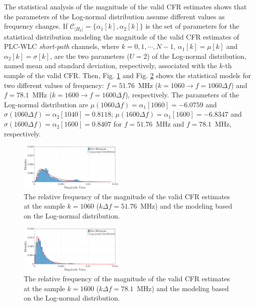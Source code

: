 \documentclass[journal]{IEEEtran}
\begin{document}
The statistical analysis of the magnitude of the valid \ac{CFR} estimates shows that the parameters of the Log-normal distribution assume different values as frequency changes. If $\mathcal{C}_{|H_k|} = \{\alpha_1[k],\alpha_2[k]\}$ is the set of parameters for the statistical distribution modeling the magnitude of the valid \ac{CFR} estimates of \ac{PLC}-\ac{WLC} \textit{short-path} channels, where $k=0,1,\cdots,N-1$,  $\alpha_1[k] = \mu[k]$ and $\alpha_2[k] = \sigma[k]$, are the two parameters ($U=2$) of the Log-normal distribution, named mean and standard deviation, respectively, associated with the $k$-th sample of the valid \ac{CFR}. Then, Fig. \ref{mag_examplelW} and Fig. \ref{mag_example2lW} shows the statistical models for two different values of frequency: $f=51.76$~MHz ($k=1060 \rightarrow f = 1060\Delta f$) and $f=78.1$~MHz ($k=1600 \rightarrow f = 1600\Delta f$), respectively. The parameters of the Log-normal distribution are  $\mu(1060 \Delta f) = \alpha_1[1060]=-6.0759$ and $\sigma( 1060 \Delta f) = \alpha_2[1040] = 0.8118$; $\mu(1600 \Delta f) = \alpha_1[1600] = -6.8347$ and $\sigma( 1600 \Delta f) = \alpha_2[1600]=0.8407$ for $f=51.76$~MHz and $f=78.1$~MHz, respectively.

\begin{figure}[h!]
	\centering
	\includegraphics[width=0.45\textwidth]{images/Mag_histlW_2.eps}
	\caption{The relative frequency of the magnitude of the valid CFR estimates at the sample $k = 1060$ ($k\Delta f= 51.76$~MHz) and the modeling based on the Log-normal distribution.}
	\label{mag_examplelW}
\end{figure}

\begin{figure}[h!]
	\centering
	\includegraphics[width=0.45\textwidth]{images/Mag_hist2lW_2.eps}
	\caption{ The relative frequency of the magnitude of the valid CFR estimates at the sample $k = 1600$ ($k\Delta f= 78.1$~MHz) and the modeling based on the Log-normal distribution.}
	\label{mag_example2lW}
\end{figure}
\end{document}

